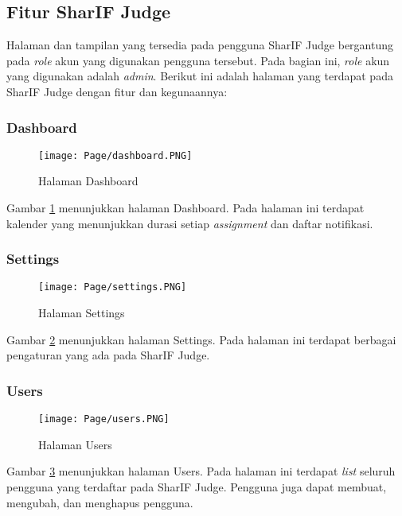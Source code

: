 \subsection{Fitur SharIF Judge}
\label{subs:3:fitur}

Halaman dan tampilan yang tersedia pada pengguna SharIF Judge bergantung pada \textit{role} akun yang digunakan pengguna tersebut. Pada bagian ini, \textit{role} akun yang digunakan adalah \textit{admin}. Berikut ini adalah halaman yang terdapat pada SharIF Judge dengan fitur dan kegunaannya:

\subsubsection{Dashboard}
    \begin{figure}[H]
    	\centering  
    	\texttt{[image: Page/dashboard.PNG]}  
    	\caption{Halaman Dashboard}
    	\label{fig:3:dashboard} 
    \end{figure} 
    
    Gambar \ref{fig:3:dashboard} menunjukkan halaman Dashboard. Pada halaman ini terdapat kalender yang menunjukkan durasi setiap \textit{assignment} dan daftar notifikasi.
    
\subsubsection{Settings}
    \begin{figure}[H]
    	\centering  
    	\texttt{[image: Page/settings.PNG]}  
    	\caption{Halaman Settings}
    	\label{fig:3:settings} 
    \end{figure} 
    
    Gambar \ref{fig:3:settings} menunjukkan halaman Settings. Pada halaman ini terdapat berbagai pengaturan yang ada pada SharIF Judge.
    
\subsubsection{Users}
    \begin{figure}[H]
    	\centering  
    	\texttt{[image: Page/users.PNG]}  
    	\caption{Halaman Users}
    	\label{fig:3:users} 
    \end{figure} 
    
    Gambar \ref{fig:3:users} menunjukkan halaman Users. Pada halaman ini terdapat \textit{list} seluruh pengguna yang terdaftar pada SharIF Judge. Pengguna juga dapat membuat, mengubah, dan menghapus pengguna.
    
